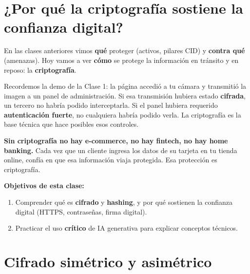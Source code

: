 \documentclass[12pt,a4paper]{article}
\begin{document}
\tableofcontents
\newpage

\section{¿Por qu\'e la criptograf\'ia sostiene la confianza digital?}

En las clases anteriores vimos \textbf{qu\'e} proteger (activos, pilares CID) y \textbf{contra qu\'e} (amenazas). Hoy vamos a ver \textbf{c\'omo} se protege la informaci\'on en tr\'ansito y en reposo: la \textbf{criptograf\'ia}.

\begin{cajaConcepto}[title={Conexi\'on con lo anterior}]
Recordemos la demo de la Clase 1: la página accedi\'o a tu cámara y transmiti\'o la imagen a un panel de administraci\'on. Si esa transmisi\'on hubiera estado \textbf{cifrada}, un tercero no habr\'ia podido interceptarla. Si el panel hubiera requerido \textbf{autenticaci\'on fuerte}, no cualquiera habr\'ia podido verla. La criptograf\'ia es la base t\'ecnica que hace posibles esos controles.
\end{cajaConcepto}

\begin{cajaNota}
\textbf{Sin criptograf\'ia no hay e-commerce, no hay fintech, no hay home banking.} Cada vez que un cliente ingresa los datos de su tarjeta en tu tienda online, conf\'ia en que esa informaci\'on viaja protegida. Esa protecci\'on es criptograf\'ia.
\end{cajaNota}

\vspace{6pt}
\noindent\textbf{Objetivos de esta clase:}
\begin{enumerate}[leftmargin=2em]
  \item Comprender qu\'e es \textbf{cifrado} y \textbf{hashing}, y por qu\'e sostienen la confianza digital (HTTPS, contrase\~nas, firma digital).
  \item Practicar el uso \textbf{cr\'itico} de IA generativa para explicar conceptos t\'ecnicos.
\end{enumerate}

\newpage
\section{Cifrado sim\'etrico y asim\'etrico}
\end{document}
